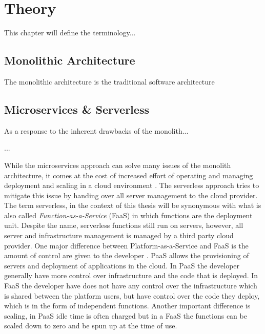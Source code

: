 
\chapter{Theory}
This chapter will define the terminology... 
\label{cha:theory}
\section{Monolithic Architecture}
The monolithic architecture is the traditional software architecture 



\section{Microservices \& Serverless}
As a response to the inherent drawbacks of the monolith... 

...

While the microservices approach can solve many issues of the monolith architecture, it comes at the cost of increased effort of operating and managing deployment and scaling in a cloud environment \cite{cost_comparison_of_running_monolithic_microservice_AWS_lambda}. The serverless approach tries to mitigate this issue by handing over all server management to the cloud provider. The term serverless, in the context of this thesis will be synonymous with what is also called \textit{Function-as-a-Service} (FaaS) in which functions are the deployment unit. Despite the name, serverless functions still run on servers, however, all server and infrastructure management is managed by a third party cloud provider. One major difference between Platform-as-a-Service and FaaS is the amount of control are given to the developer \cite{serverless_computing_current_trends}. PaaS allows the provisioning of servers and deployment of applications in the cloud. In PaaS the developer generally have more control over infrastructure and the code that is deployed. In FaaS the developer have does not have any control over the infrastructure which is shared between the platform users, but have control over the code they deploy, which is in the form of independent functions. Another important difference is scaling, in PaaS idle time is often charged but in a FaaS the functions can be scaled down to zero and be spun up at the time of use. 

